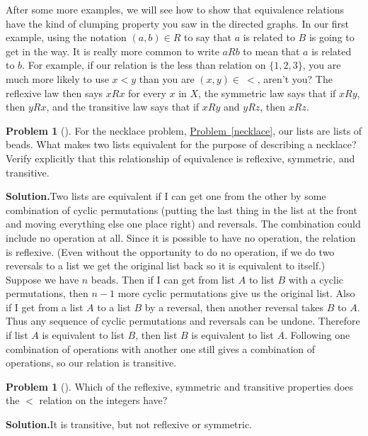 \documentclass[10pt,]{book}
\theoremstyle{plain}
\theoremstyle{definition}
\newtheorem{activity}[project]{Problem}
\theoremstyle{definition}
\numberwithin{equation}{chapter}
\newcommand{\lt}{<}
\begin{document}
\par
After some more examples, we will see how to show that equivalence relations have the kind of clumping property you saw in the directed graphs. In our first example, using the notation \((a,b) \in R\) to say that \(a\) is related to \(B\) is going to get in the way. It is really more common to write \(a
R b\) to mean that \(a\) is related to \(b\). For example, if our relation is the less than relation on \(\{1,2,3\}\), you are much more likely to use \(x\lt y\) than you are \((x,y)\in \ \lt\), aren't you? The reflexive law then says \(xRx\) for every \(x\) in \(X\), the symmetric law says that if \(xRy\), then \(yRx\), and the transitive law says that if \(xRy\) and \(yRz\), then \(xRz\).%
\begin{activity}[]\label{nchoosekanotherway}
For the necklace problem, \hyperref[necklace]{Problem~\ref{necklace}}, our lists are lists of beads. What makes two lists equivalent for the purpose of describing a necklace? Verify explicitly that this relationship of equivalence is reflexive, symmetric, and transitive.%
\par\medskip\noindent%
\textbf{Solution.}\quad Two lists are equivalent if I can get one from the other by some combination of cyclic permutations (putting the last thing in the list at the front and moving everything else one place right) and reversals. The combination could include no operation at all. Since it is possible to have no operation, the relation is reflexive. (Even without the opportunity to do no operation, if we do two reversals to a list we get the original list back so it is equivalent to itself.) Suppose we have \(n\) beads. Then if I can get from list \(A\) to list \(B\) with a cyclic permutations, then \(n-1\) more cyclic permutations give us the original list. Also if I get from a list \(A\) to a list \(B\) by a reversal, then another reversal takes \(B\) to \(A\). Thus any sequence of cyclic permutations and reversals can be undone. Therefore if list \(A\) is equivalent to list \(B\), then list \(B\) is equivalent to list \(A\). Following one combination of operations with another one still gives a combination of operations, so our relation is transitive.%
\end{activity}
\begin{activity}[]\label{activity-348}
Which of the reflexive, symmetric and transitive properties does the \(\lt\) relation on the integers have?%
\par\medskip\noindent%
\textbf{Solution.}\quad It is transitive, but not reflexive or symmetric.%
\end{activity}
\end{document}
